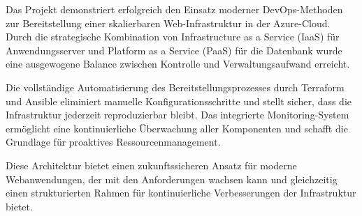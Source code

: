 Das Projekt demonstriert erfolgreich den Einsatz moderner DevOps-Methoden zur Bereitstellung einer skalierbaren Web-Infrastruktur in der Azure-Cloud. Durch die strategische Kombination von Infrastructure as a Service (IaaS) für Anwendungsserver und Platform as a Service (PaaS) für die Datenbank wurde eine ausgewogene Balance zwischen Kontrolle und Verwaltungsaufwand erreicht.

Die vollständige Automatisierung des Bereitstellungsprozesses durch Terraform und Ansible eliminiert manuelle Konfigurationsschritte und stellt sicher, dass die Infrastruktur jederzeit reproduzierbar bleibt. Das integrierte Monitoring-System ermöglicht eine kontinuierliche Überwachung aller Komponenten und schafft die Grundlage für proaktives Ressourcenmanagement.

Diese Architektur bietet einen zukunftssicheren Ansatz für moderne Webanwendungen, der mit den Anforderungen wachsen kann und gleichzeitig einen strukturierten Rahmen für kontinuierliche Verbesserungen der Infrastruktur bietet.
